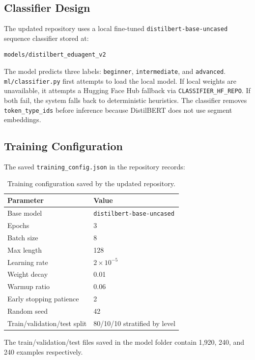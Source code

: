 \documentclass[11pt,a4paper]{article}
\begin{document}
\subsection{Classifier Design}

The updated repository uses a local fine-tuned \texttt{distilbert-base-uncased} sequence classifier stored at:

\begin{lstlisting}
models/distilbert_eduagent_v2
\end{lstlisting}

The model predicts three labels: \texttt{beginner}, \texttt{intermediate}, and \texttt{advanced}. \texttt{ml/classifier.py} first attempts to load the local model. If local weights are unavailable, it attempts a Hugging Face Hub fallback via \texttt{CLASSIFIER\_HF\_REPO}. If both fail, the system falls back to deterministic heuristics. The classifier removes \texttt{token\_type\_ids} before inference because DistilBERT does not use segment embeddings.

\subsection{Training Configuration}

The saved \texttt{training\_config.json} in the repository records:

\begin{table}[H]
\centering
\begin{tabular}{ll}
\toprule
\textbf{Parameter} & \textbf{Value} \\
\midrule
Base model & \texttt{distilbert-base-uncased} \\
Epochs & 3 \\
Batch size & 8 \\
Max length & 128 \\
Learning rate & $2 \times 10^{-5}$ \\
Weight decay & 0.01 \\
Warmup ratio & 0.06 \\
Early stopping patience & 2 \\
Random seed & 42 \\
Train/validation/test split & 80/10/10 stratified by level \\
\bottomrule
\end{tabular}
\caption{Training configuration saved by the updated repository.}
\end{table}

The train/validation/test files saved in the model folder contain 1,920, 240, and 240 examples respectively.
\end{document}

